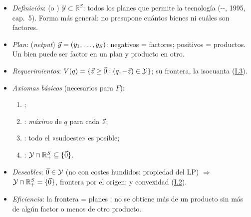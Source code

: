 \documentclass{article}
\begin{document}
\begin{columnas}
\begin{itemize}
\item \emph{Definición}:  (o ) $\mathcal{Y}\subset\mathbb{R}^S$: todos los planes que permite la tecnología (--, 1995, cap.~5). Forma más general: no presupone cuántos bienes ni cuáles son factores.
\item \emph{Plan}:  (\emph{netput}) $\vec{y}=(y_1,\dots,y_S)$: negativos = factores; positivos = productos. Un bien puede ser factor en un plan y producto en otro.
\item \emph{Requerimientos}:  $V(q)=\{\vec{z}\geq\vec{0}:(q,-\vec{z})\in\mathcal{Y}\}$; su frontera, la isocuanta (\hyperref[rep:I.3]{I.3}).
\item \emph{Axiomas básicos} (necesarios para $F$):
  \begin{enumerate}
  \item {};
  \item {}: \emph{máximo} de $q$ para cada $\vec{z}$;
  \item {}: todo el «sudoeste» es posible;
  \item {}: $\mathcal{Y}\cap\mathbb{R}^S_+\subseteq\{\vec{0}\}$.
  \end{enumerate}
\item \emph{Deseables}:  $\vec{0}\in\mathcal{Y}$ (no con costes hundidos: propiedad del LP) $\Rightarrow$ $\mathcal{Y}\cap\mathbb{R}^S_+=\{\vec{0}\}$, frontera por el origen; y convexidad (\hyperref[rep:I.2]{I.2}).
\item \emph{Eficiencia}: la frontera = planes : no se obtiene más de un producto sin más de algún factor o menos de otro producto.
\end{itemize}


\end{columnas}
\end{document}
